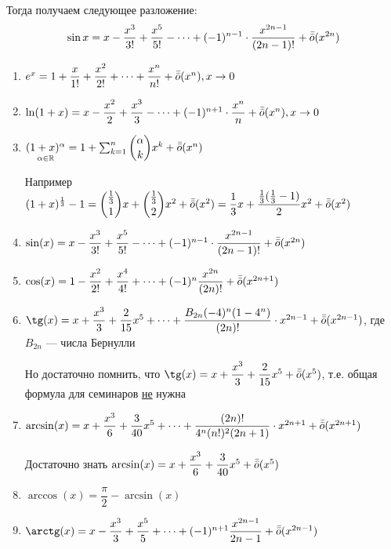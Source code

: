 \documentclass[a4paper]{article}
\theoremstyle{named}
\begin{document}
\begin{colloq}
		Тогда получаем следующее разложение:
		\begin{equation*}
			\sin x = x - \dfrac{x^3}{3!} + \dfrac{x^5}{5!} - \dots + (-1)^{n - 1} \cdot \dfrac{x^{2n - 1}}{(2n - 1)!} + \bar{\bar{o}}(x^{2n})
		\end{equation*}

		\begin{enumerate}[leftmargin=*]
			\item
			$e^x = 1 + \dfrac{x}{1!} + \dfrac{x^2}{2!} + \dots + \dfrac{x^n}{n!} + \bar{\bar{o}}(x^n), x \to 0$

			\item
			$\ln(1 + x) = x - \dfrac{x^2}{2} + \dfrac{x^3}{3} - \dots + (-1)^{n + 1} \cdot \dfrac{x^n}{n} + \bar{\bar{o}}(x^n), x \to 0$

			\item
			$\underset{\alpha \in \mathbb{R}}{(1 + x)^{\alpha}} = 1 + \sum_{k = 1}^{n} \dbinom{\alpha}{k} x^k + \bar{\bar{o}}(x^n)$

			Например $(1 + x)^{\frac{1}{3}} - 1 = \dbinom{\frac{1}{3}}{1}x + \dbinom{\frac{1}{3}}{2} x^2 + \bar{\bar{o}}(x^2) = \dfrac{1}{3} x + \dfrac{\frac{1}{3}(\frac{1}{3} - 1)}{2} x^2 + \bar{\bar{o}}(x^2)$

			\item
			$\sin (x) = x - \dfrac{x^3}{3!} + \dfrac{x^5}{5!} - \dots + (-1)^{n - 1} \cdot \dfrac{x^{2n - 1}}{(2n - 1)!} + \bar{\bar{o}}(x^{2n})$

			\item
			$\cos (x) = 1 - \dfrac{x^2}{2!} + \dfrac{x^4}{4!} + \dots + (-1)^{n} \dfrac{x^{2n}}{(2n)!} + \bar{\bar{o}}(x^{2n + 1})$

			\item
			$\tg (x) = x + \dfrac{x^3}{3} + \dfrac{2}{15} x^5 + \dots + \dfrac{B_{2n}(-4)^n(1 - 4^n)}{(2n)!} \cdot x^{2n - 1} + \os(x^{2n - 1})$, где $B_{2n}$ --- числа Бернулли

			Но достаточно помнить, что
			$\tg (x) = x + \dfrac{x^3}{3} + \dfrac{2}{15}x^5 + \os(x^5)$, т.е. общая формула для семинаров \underline{не} нужна

			\item
			$\arcsin (x) = x + \dfrac{x^3}{6} + \dfrac{3}{40} x^5 + \dots + \dfrac{(2n)!}{4^n (n!)^2 (2n + 1)} \cdot x^{2n + 1} + \bar{\bar{o}}(x^{2n + 1})$

			Достаточно знать $\arcsin (x) = x + \dfrac{x^3}{6} + \dfrac{3}{40} x^5 + \bar{\bar{o}}(x^5)$

			\item
			$\arccos (x) = \dfrac{\pi}{2} - \arcsin (x)$

			\item
			$\arctg(x) = x - \dfrac{x^3}{3} + \dfrac{x^5}{5} + \dots + (-1)^{n + 1} \dfrac{x^{2n - 1}}{2n - 1} + \os(x^{2n - 1})$
		\end{enumerate}


\end{colloq}
\end{document}
